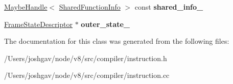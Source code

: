 \begin{DoxyCompactItemize}
\item 
\hyperlink{classv8_1_1internal_1_1_maybe_handle}{Maybe\+Handle}$<$ \hyperlink{classv8_1_1internal_1_1_shared_function_info}{Shared\+Function\+Info} $>$ const {\bfseries shared\+\_\+info\+\_\+}\hypertarget{classv8_1_1internal_1_1compiler_1_1_frame_state_descriptor_a4bab5c5f02cbcc2dc4a7b498eb524ad2}{}\label{classv8_1_1internal_1_1compiler_1_1_frame_state_descriptor_a4bab5c5f02cbcc2dc4a7b498eb524ad2}

\item 
\hyperlink{classv8_1_1internal_1_1compiler_1_1_frame_state_descriptor}{Frame\+State\+Descriptor} $\ast$ {\bfseries outer\+\_\+state\+\_\+}\hypertarget{classv8_1_1internal_1_1compiler_1_1_frame_state_descriptor_a37a87c7a5e2dd90cd1a0ab6e14ba9134}{}\label{classv8_1_1internal_1_1compiler_1_1_frame_state_descriptor_a37a87c7a5e2dd90cd1a0ab6e14ba9134}

\end{DoxyCompactItemize}


The documentation for this class was generated from the following files\+:\begin{DoxyCompactItemize}
\item 
/\+Users/joshgav/node/v8/src/compiler/instruction.\+h\item 
/\+Users/joshgav/node/v8/src/compiler/instruction.\+cc\end{DoxyCompactItemize}
